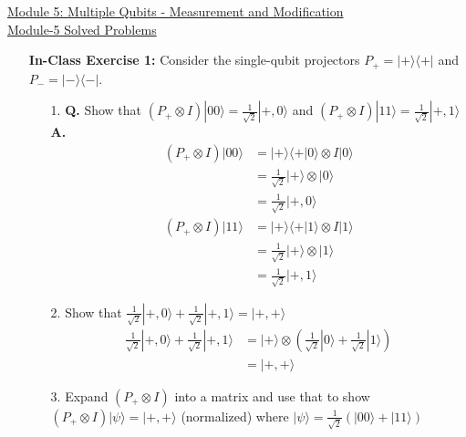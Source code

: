 \documentclass[main.tex]{subfiles}
\begin{document}
\href{https://www2.seas.gwu.edu/~simhaweb/quantum/modules/module5/module5.html}{Module 5: Multiple Qubits - Measurement and Modification}\\
\href{https://www2.seas.gwu.edu/~simhaweb/quantum/modules/module5/problems5.html}{Module-5 Solved Problems}

\begin{enumerate}

\item[] \textbf{In-Class Exercise 1:} Consider the single-qubit projectors $P_{+}=|+\rangle\langle+|$ and $P_{-}=|-\rangle\langle-|$.
    \begin{enumerate}
        \item[1.] \textbf{Q.} Show that $\left(P_{+} \otimes I\right)|00\rangle=\frac{1}{\sqrt{2}}|+, 0\rangle$ and $\left(P_{+} \otimes I\right)|11\rangle=\frac{1}{\sqrt{2}}|+, 1\rangle$ \textbf{A.}
        \begin{align*}
            \left(P_{+} \otimes I\right) |00\rangle & = |+\rangle \langle+|0\rangle \otimes I |0\rangle\\
                                                    & = \frac{1}{\sqrt{2}} |+\rangle \otimes |0\rangle\\
                                                    & = \frac{1}{\sqrt{2}} |+,0\rangle\\
            \left(P_{+} \otimes I\right)|11\rangle  & = |+\rangle \langle+|1\rangle \otimes I|1\rangle\\
                                                    & = \frac{1}{\sqrt{2}} |+\rangle \otimes |1\rangle\\
                                                    & = \frac{1}{\sqrt{2}} |+,1\rangle
        \end{align*}
        \item[2.] Show that $\frac{1}{\sqrt{2}}|+, 0\rangle+\frac{1}{\sqrt{2}}|+, 1\rangle=|+,+\rangle$
        \begin{align*}
            \frac{1}{\sqrt{2}}|+, 0\rangle
            + \frac{1}{\sqrt{2}}|+, 1\rangle    & = |+\rangle \otimes \left(\frac{1}{\sqrt{2}}| 0\rangle
                                                + \frac{1}{\sqrt{2}}| 1\rangle \right) \\
                                                & = |+,+\rangle 
        \end{align*}
        \item[3.] Expand $\left(P_{+} \otimes I\right)$ into a matrix and use that to show $\left(P_{+} \otimes I\right)|\psi\rangle=|+,+\rangle$ (normalized) where $|\psi\rangle=\frac{1}{\sqrt{2}}(|00\rangle+|11\rangle)$

\end{enumerate}
\end{enumerate}
\end{document}
